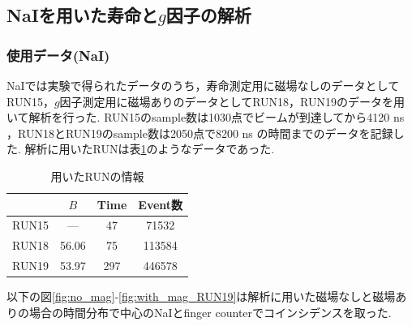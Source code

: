 
\subsection{NaIを用いた寿命と$g$因子の解析}
\subsubsection{使用データ(NaI)}
NaIでは実験で得られたデータのうち，寿命測定用に磁場なしのデータとしてRUN15，$g$因子測定用に磁場ありのデータとしてRUN18，RUN19のデータを用いて解析を行った.
RUN15のsample数は1030点でビームが到達してから4120 ns ，RUN18とRUN19のsample数は2050点で8200 ns の時間までのデータを記録した.
解析に用いたRUNは表\ref{tab:RUN_info}のようなデータであった.

\begin{table}[H]%
  \caption{用いたRUNの情報}
  \centering
  \begin{tabular}{cccc}\toprule
    & $B$ & Time\;[min] & Event数\\ \midrule
    RUN15 & --- & 47 & 71532 \\
    RUN18 & 56.06 & 75 & 113584 \\
    RUN19 & 53.97 & 297 & 446578 \\ \bottomrule
  \end{tabular}
  \label{tab:RUN_info}
\end{table}

以下の図\ref{fig:no_mag}-\ref{fig:with_mag_RUN19}は解析に用いた磁場なしと磁場ありの場合の時間分布で中心のNaIとfinger counterでコインシデンスを取った.

